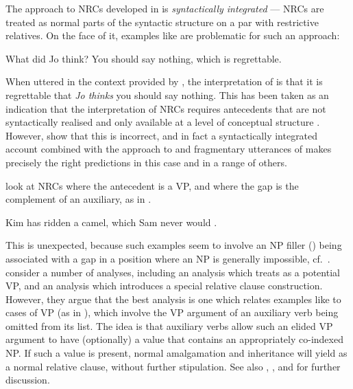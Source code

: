 \documentclass[output=paper,biblatex,babelshorthands,newtxmath,draftmode,colorlinks,citecolor=brown]{langscibook}
\begin{document}
The approach to NRCs developed in  is \emph{syntactically integrated} --- NRCs are
treated as normal parts of the syntactic structure on a par with restrictive relatives.  On the face
of it, examples like  are problematic for such an approach:

\begin{exe}\ex\begin{xlist}
  \ex\label{x:rc-113} What did Jo think?
  \ex\label{x:rc-114} You should say nothing, which is regrettable.
\end{xlist}\end{exe}

\largerpage[2]
\noindent
When uttered in the context provided by , the interpretation of 
is that it is regrettable that \emph{Jo thinks} you should say nothing. This has been
taken as an indication that the interpretation of NRCs requires antecedents that are not
syntactically realised and only available at a level of conceptual structure
\citep[see][]{Blakemore06Divisions}.  However, \citet{Arnold:Borsley:08} show that this is
incorrect, and in fact a syntactically integrated account combined with the approach to
 and fragmentary utterances of \citet{Ginzburg:Sag:00} makes precisely the right
predictions in this case and in a range of others.

\citet{Arnold:Borsley:10}\label{page-relative-clauses:stranded-aux} look at NRCs where the
antecedent is a VP, and where the gap is the complement of an
auxiliary, as in .

\begin{exe}\ex
  \label{x:rc-115}Kim has ridden a camel, which Sam never would \trace.   
\end{exe}
This is unexpected, because such examples seem to involve an NP filler () being
associated with a gap in a position where an NP is generally impossible, cf.\ . \citeauthor{Arnold:Borsley:10} consider a number of
analyses, including an analysis which treats  as a potential VP, and an
analysis which introduces a special relative clause construction. However, they argue that
the best analysis is one which relates examples like  to cases of VP 
(as in ), which involve the VP argument of
an auxiliary verb being omitted from its \comps list. The idea is that auxiliary
verbs allow such an elided VP argument to have (optionally) a  value that
contains an appropriately co-indexed NP. If such a  value is present, normal
 amalgamation and inheritance will yield  as a normal relative
clause, without further stipulation. See also ,
  ,  and 
for further discussion.
  
\end{document}
